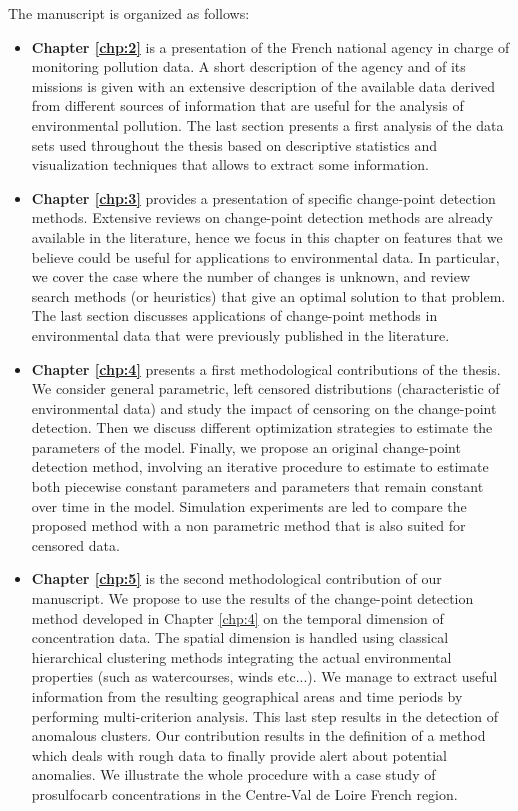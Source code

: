 The manuscript is organized as follows:
\begin{itemize}
\item{\textbf{Chapter \ref{chp:2}}} is a presentation of the French national agency in charge of monitoring pollution data. A short description of the agency and of its missions is given with an extensive description of the available data derived from different sources of information that are useful for the analysis of environmental pollution. The last section presents a first analysis of the data sets used throughout the thesis based on descriptive statistics and visualization techniques that allows to extract some information.
\item{\textbf{Chapter \ref{chp:3}}} provides a presentation of specific change-point detection methods. Extensive reviews on change-point detection  methods  are already  available in the literature,  hence we  focus  in this chapter on  features  that  we believe could  be  useful  for applications  to  environmental  data. In particular, we cover the case where the number of changes is unknown, and review search methods (or heuristics) that give an optimal solution to that problem. The last section discusses applications of change-point methods in environmental data that were previously published in the literature.
\item{\textbf{Chapter \ref{chp:4}}} presents a first methodological contributions of the thesis. 
We consider general parametric, left censored distributions (characteristic of environmental data) and study the impact of censoring on the change-point detection.  Then we discuss different optimization strategies to estimate the parameters of the model. Finally, we propose an original change-point detection method, involving an iterative procedure to estimate to estimate both piecewise constant parameters and parameters that remain constant over time in the model.  Simulation experiments are led to compare the proposed method with a non parametric method that is also suited for censored data. 
\item{\textbf{Chapter \ref{chp:5}}} is the second methodological contribution of our manuscript. We propose to use the results of the change-point detection method developed in Chapter \ref{chp:4} on the temporal dimension of concentration data. The spatial dimension is handled using classical hierarchical clustering methods integrating the actual environmental properties (such as watercourses, winds etc...).
We manage to extract useful information from the resulting geographical areas and time periods by performing multi-criterion analysis. This last step results in the detection of anomalous clusters. Our contribution results in the definition of a method which deals with rough data to finally provide alert about potential anomalies. We illustrate the whole procedure with a case study of prosulfocarb concentrations in the Centre-Val de Loire French region.

\end{itemize}
